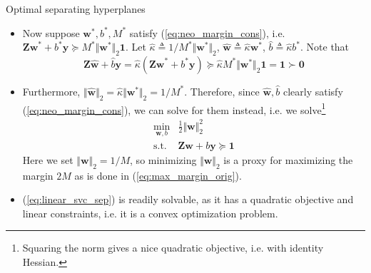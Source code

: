 \documentclass{beamer}
\numberwithin{equation}{section}
\newcommand{\aref}[1]{\alert{\ref{#1}}}
\begin{document}
\begin{frame}{Optimal separating hyperplanes}
    \begin{itemize}
        \item
        Now suppose $ \mathbf{w}^*, b^*, M^* $ satisfy
        (\aref{eq:neo_margin_cons}), i.e. $ \mathbf{Zw}^* + b^*\mathbf{y}
        \succeq M^*\Vert\mathbf{w}^*\Vert_2\mathbf{1} $. Let $ \hat{\kappa}
        \triangleq 1 / M^*\Vert\mathbf{w}^*\Vert_2 $, $ \hat{\mathbf{w}}
        \triangleq \hat{\kappa}\mathbf{w}^* $, $ \hat{b} \triangleq
        \hat{\kappa}b^* $. Note that
        \begin{equation*}
            \mathbf{Z}\hat{\mathbf{w}} + \hat{b}\mathbf{y} =
            \hat{\kappa}(\mathbf{Zw}^* + b^*\mathbf{y}) \succeq
            \hat{\kappa}M^*\Vert\mathbf{w}^*\Vert_2\mathbf{1} = \mathbf{1}
            \succ \mathbf{0}
        \end{equation*}

        \item
        Furthermore, $ \Vert\hat{\mathbf{w}}\Vert_2 =
        \hat{\kappa}\Vert\mathbf{w}^*\Vert_2 = 1 / M^* $. Therefore, since
        $ \hat{\mathbf{w}}, \hat{b} $ clearly satisfy
        (\aref{eq:neo_margin_cons}), we can solve for them instead, i.e. we
        solve\footnote{
            Squaring the norm gives a nice quadratic objective, i.e. with
            identity Hessian.
        }
        \begin{equation} \label{eq:linear_svc_sep}
            \begin{array}{ll}
                \displaystyle\min_{\mathbf{w}, b} &
                \frac{1}{2}\Vert\mathbf{w}\Vert_2^2 \\
                \text{s.t.} & \mathbf{Zw} + b\mathbf{y} \succeq \mathbf{1}
            \end{array}
        \end{equation}
        Here we set $ \Vert\mathbf{w}\Vert_2 = 1 / M $, so minimizing
        $ \Vert\mathbf{w}\Vert_2 $ is a proxy for maximizing the margin $ 2M $
        as is done in (\aref{eq:max_margin_orig}).

        \item
        (\aref{eq:linear_svc_sep}) is readily solvable, as it has a quadratic
        objective and linear constraints, i.e. it is a \alert{convex}
        optimization problem.
    \end{itemize}

    \medskip
\end{frame}
\end{document}
